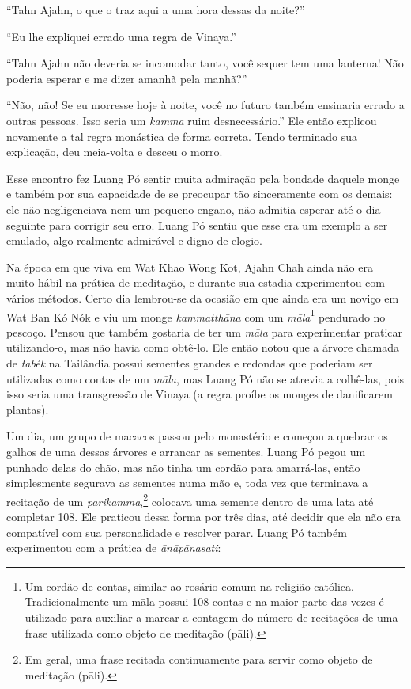 ``Tahn Ajahn, o que o traz aqui a uma hora dessas da noite?''

``Eu lhe expliquei errado uma regra de Vinaya.''

``Tahn Ajahn não deveria se incomodar tanto, você sequer tem uma
lanterna! Não poderia esperar e me dizer amanhã pela manhã?''

``Não, não! Se eu morresse hoje à noite, você no futuro também ensinaria
errado a outras pessoas. Isso seria um \emph{kamma} ruim
desnecessário.'' Ele então explicou novamente a tal regra monástica de
forma correta. Tendo terminado sua explicação, deu meia-volta e desceu o
morro.

Esse encontro fez Luang Pó sentir muita admiração pela bondade daquele
monge e também por sua capacidade de se preocupar tão sinceramente com
os demais: ele não negligenciava nem um pequeno engano, não admitia
esperar até o dia seguinte para corrigir seu erro. Luang Pó sentiu que
esse era um exemplo a ser emulado, algo realmente admirável e digno de
elogio.

Na época em que viva em Wat Khao Wong Kot, Ajahn Chah ainda não era
muito hábil na prática de meditação, e durante sua estadia experimentou
com vários métodos. Certo dia lembrou-se da ocasião em que ainda era um
noviço em Wat Ban Kó Nók e viu um monge \emph{kammatthāna} com um
\emph{māla}\footnote{Um cordão de contas, similar ao rosário comum na
  religião católica. Tradicionalmente um māla possui 108 contas e na
  maior parte das vezes é utilizado para auxiliar a marcar a contagem do
  número de recitações de uma frase utilizada como objeto de meditação
  (pāli).} pendurado no pescoço. Pensou que também gostaria de ter um
\emph{māla} para experimentar praticar utilizando-o, mas não havia como
obtê-lo. Ele então notou que a árvore chamada de \emph{tabék} na
Tailândia possui sementes grandes e redondas que poderiam ser utilizadas
como contas de um \emph{māla}, mas Luang Pó não se atrevia a colhê-las,
pois isso seria uma transgressão de Vinaya (a regra proíbe os monges de
danificarem plantas).

Um dia, um grupo de macacos passou pelo monastério e começou a quebrar
os galhos de uma dessas árvores e arrancar as sementes. Luang Pó pegou
um punhado delas do chão, mas não tinha um cordão para amarrá-las, então
simplesmente segurava as sementes numa mão e, toda vez que terminava a
recitação de um \emph{parikamma},\footnote{Em geral, uma frase recitada
  continuamente para servir como objeto de meditação (pāli).}
colocava uma semente dentro de uma lata até completar 108. Ele praticou
dessa forma por três dias, até decidir que ela não era \mbox{compatível} com
sua personalidade e resolver parar. Luang Pó também experimentou com a
prática de \emph{ānāpānasati}:

